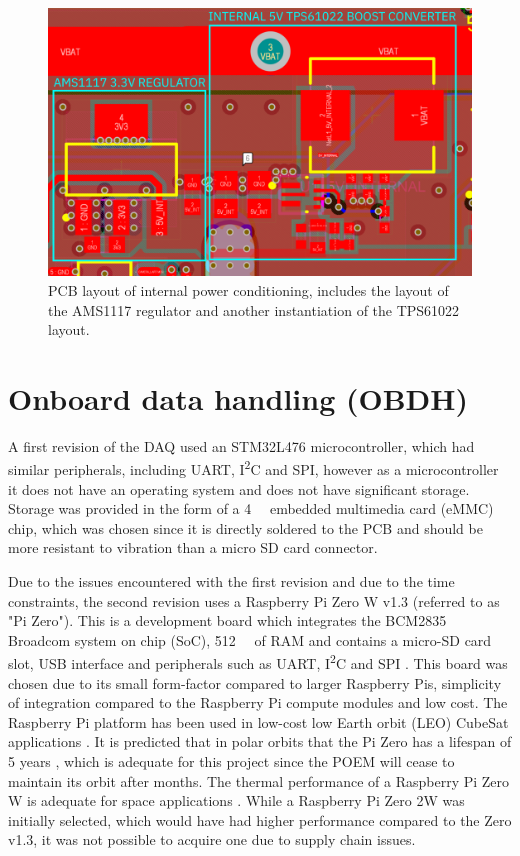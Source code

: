 \documentclass[]{report}
\newcommand{\iic}{{I\textsuperscript{2}C}}
\begin{document}
\begin{figure}[H]
  \centering
  \includegraphics[width=\linewidth]{images/internal-power-supply.png}
  \caption{PCB layout of internal power conditioning, includes the layout of the AMS1117 regulator and another instantiation of the TPS61022 layout.}
  \label{fig:internal-power-supply}
\end{figure}

\section{Onboard data handling (OBDH)}

A first revision of the DAQ used an STM32L476 microcontroller, which had similar peripherals, including UART, {\iic} and SPI, however as a microcontroller it does not have an operating system and does not have significant storage. Storage was provided in the form of a \SI{4}{\giga\byte} embedded multimedia card (eMMC) chip, which was chosen since it is directly soldered to the PCB and should be more resistant to vibration than a micro SD card connector.

Due to the issues encountered with the first revision and due to the time constraints, the second revision uses a Raspberry Pi Zero W v1.3 (referred to as "Pi Zero"). This is a development board which integrates the BCM2835 Broadcom system on chip (SoC), \SI{512}{\mega\byte} of RAM and contains a micro-SD card slot, USB interface and peripherals such as UART, {\iic} and SPI \cite{upton2016raspberry}. This board was chosen due to its small form-factor compared to larger Raspberry Pis, simplicity of integration compared to the Raspberry Pi compute modules and low cost. The Raspberry Pi platform has been used in low-cost low Earth orbit (LEO) CubeSat applications \cite{guertin2022raspberry}. It is predicted that in polar orbits that the Pi Zero has a lifespan of 5 years \cite{guertin2022raspberry}, which is adequate for this project since the POEM will cease to maintain its orbit after  months. The thermal performance of a Raspberry Pi Zero W is adequate for space applications \cite{guertin2022raspberry}. While a Raspberry Pi Zero 2W was initially selected, which would have had higher performance compared to the Zero v1.3, it was not possible to acquire one due to supply chain issues.
\end{document}
